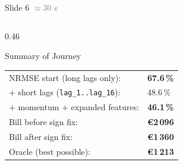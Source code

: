 \documentclass[aspectratio=169, 10pt]{beamer}
\newcommand{\good}[1]{\textcolor{greenok}{\textbf{#1}}}
\newcommand{\bad}[1]{\textcolor{reddanger}{\textbf{#1}}}
\begin{document}
\begin{frame}{Slide 6 \hfill \textcolor{gray}{\small$\approx$30 s}}
\begin{columns}[T]
\begin{column}{0.46\textwidth}
      \vspace{4pt}
      \begin{exampleblock}{Summary of Journey}
        \footnotesize
        \begin{tabular}{ll}
          NRMSE start (long lags only): & \bad{67.6\,\%} \\
          + short lags (\texttt{lag\_1..lag\_16}): & 48.6\,\% \\
          + momentum + expanded features: & \good{46.1\,\%} \\[3pt]
          Bill before sign fix: & \bad{\euro2\,096} \\
          Bill after sign fix: & \good{\euro1\,360} \\
          Oracle (best possible): & \good{\euro1\,213} \\
        \end{tabular}
      \end{exampleblock}
    \end{column}
  \end{columns}
\end{frame}

\end{document}
